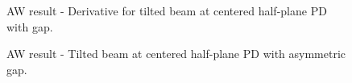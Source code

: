 \documentclass[aps,twoside,secnumarabic,balancelastpage,amsmath,amssymb,nofootinbib,hyperref=pdftex]{revtex4}
\begin{document}
		\begin{figure}
	\centering
	\caption{AW result - Derivative for tilted beam at centered half-plane PD with gap.}
	\label{fig:12}
	\end{figure}
	
\clearpage

	\begin{figure}
	\centering
	\caption{AW result - Tilted beam at centered half-plane PD with asymmetric gap.}
	\label{fig:13}
	\end{figure}
	
\end{document}
